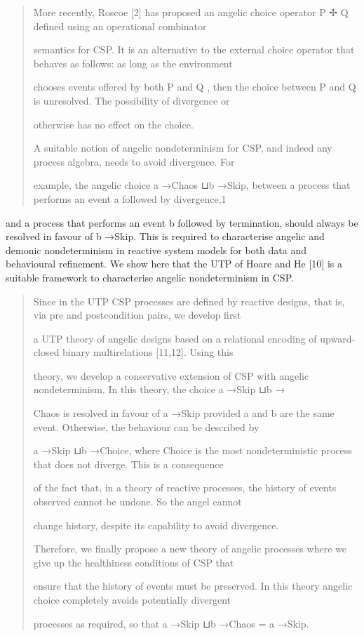 \documentclass[11pt]{article}
\begin{document}
\begin{quote}\small\raggedright
More recently, Roscoe [2] has proposed an angelic choice operator P ✢ Q defined using an operational combinator
\par
semantics for CSP. It is an alternative to the external choice operator that behaves as follows: as long as the environment
\par
chooses events offered by both P and Q , then the choice between P and Q is unresolved. The possibility of divergence or
\par
otherwise has no effect on the choice.
\par
A suitable notion of angelic nondeterminism for CSP, and indeed any process algebra, needs to avoid divergence. For
\par
example, the angelic choice a →Chaos ⊔b →Skip, between a process that performs an event a followed by divergence,1
\end{quote}

and a process that performs an event b followed by termination, should always be resolved in favour of b →Skip. This is required to characterise angelic and demonic nondeterminism in reactive system models for both data and behavioural refinement. We show here that the UTP of Hoare and He [10] is a suitable framework to characterise angelic nondeterminism in CSP.

\begin{quote}\small\raggedright
Since in the UTP CSP processes are defined by reactive designs, that is, via pre and postcondition pairs, we develop first
\par
a UTP theory of angelic designs based on a relational encoding of upward-closed binary multirelations [11,12]. Using this
\par
theory, we develop a conservative extension of CSP with angelic nondeterminism. In this theory, the choice a →Skip ⊔b →
\par
Chaos is resolved in favour of a →Skip provided a and b are the same event. Otherwise, the behaviour can be described by
\par
a →Skip ⊔b →Choice, where Choice is the most nondeterministic process that does not diverge. This is a consequence
\par
of the fact that, in a theory of reactive processes, the history of events observed cannot be undone. So the angel cannot
\par
change history, despite its capability to avoid divergence.
\par
Therefore, we finally propose a new theory of angelic processes where we give up the healthiness conditions of CSP that
\par
ensure that the history of events must be preserved. In this theory angelic choice completely avoids potentially divergent
\par
processes as required, so that a →Skip ⊔b →Chaos = a →Skip.
\end{quote}
\end{document}
